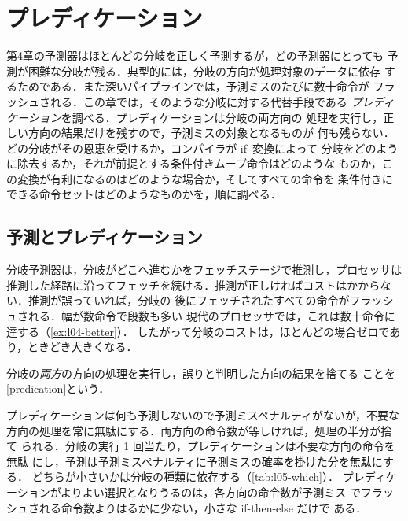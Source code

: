 \documentclass[../main.tex]{subfiles}
\begin{document}
\chapter{プレディケーション}

第4章の予測器はほとんどの分岐を正しく予測するが，どの予測器にとっても
予測が困難な分岐が残る．典型的には，分岐の方向が処理対象のデータに依存
するためである．また深いパイプラインでは，予測ミスのたびに数十命令が
フラッシュされる．この章では，そのような分岐に対する代替手段である
\emph{プレディケーション}を調べる．プレディケーションは分岐の両方向の
処理を実行し，正しい方向の結果だけを残すので，予測ミスの対象となるものが
何も残らない．どの分岐がその恩恵を受けるか，コンパイラが if~変換によって
分岐をどのように除去するか，それが前提とする条件付きムーブ命令はどのような
ものか，この変換が有利になるのはどのような場合か，そしてすべての命令を
条件付きにできる命令セットはどのようなものかを，順に調べる．

\section{予測とプレディケーション}
\label{sec:l05-predication}

分岐予測器は，分岐がどこへ進むかをフェッチステージで推測し，プロセッサは
推測した経路に沿ってフェッチを続ける．推測が正しければコストはかからない．推測が誤っていれば，分岐の
後にフェッチされたすべての命令がフラッシュされる．幅が数命令で段数も多い
現代のプロセッサでは，これは数十命令に達する（\cref{ex:l04-better}）．
したがって分岐のコストは，ほとんどの場合ゼロであり，ときどき大きくなる．

\begin{definition}[プレディケーション]
  \label{def:l05-predication}
  分岐の\emph{両方}の方向の処理を実行し，誤りと判明した方向の結果を捨てる
  ことを[predication]という．
\end{definition}

プレディケーションは何も予測しないので予測ミスペナルティがないが，不要な
方向の処理を常に無駄にする．両方向の命令数が等しければ，処理の半分が捨て
られる．分岐の実行 1 回当たり，プレディケーションは不要な方向の命令を無駄
にし，予測は予測ミスペナルティに予測ミスの確率を掛けた分を無駄にする．
どちらが小さいかは分岐の種類に依存する（\cref{tab:l05-which}）．
プレディケーションがよりよい選択となりうるのは，各方向の命令数が予測ミス
でフラッシュされる命令数よりはるかに少ない，小さな if-then-else だけで
ある．
\end{document}
